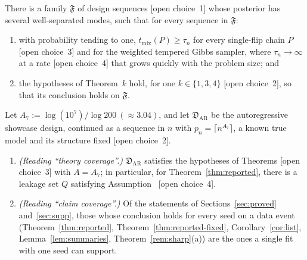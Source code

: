 \begin{planthm}\label{thm:trap}
There is a family $\mathfrak F$ of design sequences \textup{[open choice~1]} whose posterior has several well-separated
modes, such that for every sequence in $\mathfrak F$:
\begin{enumerate}[label=(\roman*),leftmargin=2em,itemsep=1pt]
  \item with probability tending to one, $t_{\mathrm{mix}}(P)\ge\tau_n$ for every single-flip chain $P$
    \textup{[open choice~3]} and for the weighted tempered Gibbs sampler, where $\tau_n\to\infty$ at a rate
    \textup{[open choice~4]} that grows quickly with the problem size; and
  \item the hypotheses of Theorem~$k$ hold, for one $k\in\{1,3,4\}$ \textup{[open choice~2]}, so that its conclusion holds
    on $\mathfrak F$.
\end{enumerate}
\end{planthm}



\begin{planthm}[Coverage at $p=10^7$; candidate]\label{thm:cov7}
Let $A_7:=\log(10^7)/\log200\ (\approx3.04)$, and let $\mathfrak D_{\mathrm{AR}}$ be the autoregressive showcase design,
continued as a sequence in $n$ with $p_n=\lceil n^{A_7}\rceil$, a known true model and its structure fixed
\textup{[open choice~2]}.
\begin{enumerate}[label=(\roman*),leftmargin=2em,itemsep=1pt]
  \item \emph{(Reading ``theory coverage''.)} $\mathfrak D_{\mathrm{AR}}$ satisfies the hypotheses of Theorems
    \textup{[open choice~3]} with $A=A_7$; in particular, for Theorem~\ref{thm:reported}, there is a leakage set $Q$
    satisfying Assumption~ \textup{[open choice~4]}.
  \item \emph{(Reading ``claim coverage''.)} Of the statements of Sections~\ref{sec:proved} and~\ref{sec:supp}, those
    whose conclusion holds for every seed on a data event (Theorem~\ref{thm:reported}, Theorem~\ref{thm:reported-fixed},
    Corollary~\ref{cor:list}, Lemma~\ref{lem:summaries}, Theorem~\ref{rem:sharp}(a)) are the ones a single fit with one
    seed can support.
\end{enumerate}
\end{planthm}

